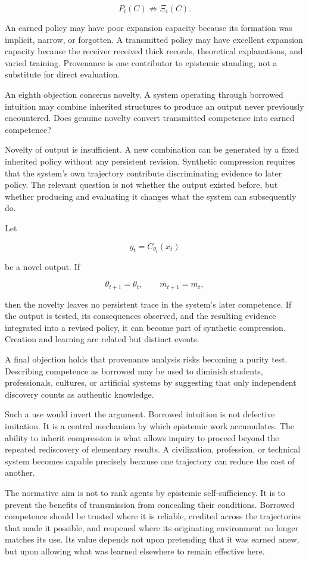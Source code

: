 \documentclass[11pt]{article}
\begin{document}
\[
P_i(C)
\not\Rightarrow
\Xi_i(C).
\]

An earned policy may have poor expansion capacity because its formation was implicit, narrow, or forgotten. A transmitted policy may have excellent expansion capacity because the receiver received thick records, theoretical explanations, and varied training. Provenance is one contributor to epistemic standing, not a substitute for direct evaluation.

An eighth objection concerns novelty. A system operating through borrowed intuition may combine inherited structures to produce an output never previously encountered. Does genuine novelty convert transmitted competence into earned competence?

Novelty of output is insufficient. A new combination can be generated by a fixed inherited policy without any persistent revision. Synthetic compression requires that the system's own trajectory contribute discriminating evidence to later policy. The relevant question is not whether the output existed before, but whether producing and evaluating it changes what the system can subsequently do.

Let

\[
y_t=C_{\theta_t}(x_t)
\]

be a novel output. If

\[
\theta_{t+1}=\theta_t,
\qquad
m_{t+1}=m_t,
\]

then the novelty leaves no persistent trace in the system's later competence. If the output is tested, its consequences observed, and the resulting evidence integrated into a revised policy, it can become part of synthetic compression. Creation and learning are related but distinct events.

A final objection holds that provenance analysis risks becoming a purity test. Describing competence as borrowed may be used to diminish students, professionals, cultures, or artificial systems by suggesting that only independent discovery counts as authentic knowledge.

Such a use would invert the argument. Borrowed intuition is not defective imitation. It is a central mechanism by which epistemic work accumulates. The ability to inherit compression is what allows inquiry to proceed beyond the repeated rediscovery of elementary results. A civilization, profession, or technical system becomes capable precisely because one trajectory can reduce the cost of another.

The normative aim is not to rank agents by epistemic self-sufficiency. It is to prevent the benefits of transmission from concealing their conditions. Borrowed competence should be trusted where it is reliable, credited across the trajectories that made it possible, and reopened where its originating environment no longer matches its use. Its value depends not upon pretending that it was earned anew, but upon allowing what was learned elsewhere to remain effective here.
\end{document}
